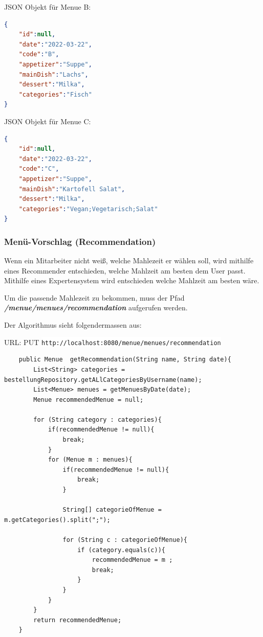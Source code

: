 JSON Objekt für Menue B:

\begin{lstlisting}[language=json,firstnumber=1]
{
    "id":null,
    "date":"2022-03-22",
    "code":"B",
    "appetizer":"Suppe",
    "mainDish":"Lachs",
    "dessert":"Milka",
    "categories":"Fisch"
}
\end{lstlisting}

JSON Objekt für Menue C:

\begin{lstlisting}[language=json,firstnumber=1]
{
    "id":null,
    "date":"2022-03-22",
    "code":"C",
    "appetizer":"Suppe",
    "mainDish":"Kartofell Salat",
    "dessert":"Milka",
    "categories":"Vegan;Vegetarisch;Salat"
}
\end{lstlisting}

\subsubsection{Menü-Vorschlag (Recommendation)}

Wenn ein Mitarbeiter nicht weiß, welche Mahlezeit er wählen soll, wird mithilfe eines Recommender entschieden, welche Mahlzeit am besten dem 
User passt. Mithilfe eines Expertensystem wird entschieden welche Mahlzeit am besten wäre. 

Um die passende Mahlezeit zu bekommen, muss der Pfad \textbf{\textit{/menue/menues/recommendation}} aufgerufen werden.

Der Algorithmus sieht folgendermassen aus:

URL: PUT \colorbox{white}{\lstinline[basicstyle=\ttfamily\color{black},language=html]|http://localhost:8080/menue/menues/recommendation|}

\begin{lstlisting}
    public Menue  getRecommendation(String name, String date){
        List<String> categories = bestellungRepository.getALlCategoriesByUsername(name);
        List<Menue> menues = getMenuesByDate(date);
        Menue recommendedMenue = null;

        for (String category : categories){
            if(recommendedMenue != null){
                break;
            }
            for (Menue m : menues){
                if(recommendedMenue != null){
                    break;
                }

                String[] categorieOfMenue = m.getCategories().split(";");

                for (String c : categorieOfMenue){
                    if (category.equals(c)){
                        recommendedMenue = m ;
                        break;
                    }
                }
            }
        }
        return recommendedMenue;
    }
\end{lstlisting}

